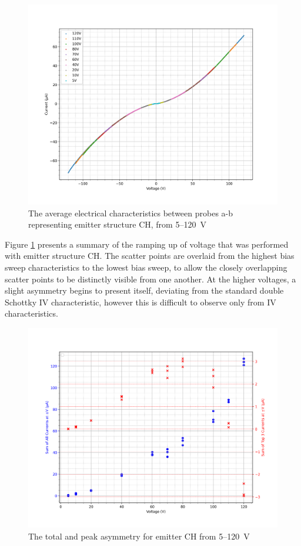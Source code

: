 \begin{refsection}
\begin{figure}[H]
    \centering
    \includegraphics[width=\linewidth]{Chapter7/Figs/Raster/Emitters/5-120V sweeps.png}
    \caption{The average electrical characteristics between probes a-b representing emitter structure CH, from 5--120~\si{\volt}}
    \label{fig:e_ch_5-120v_iv}
\end{figure}

Figure \ref{fig:e_ch_5-120v_iv} presents a summary of the ramping up of voltage that was performed with emitter structure CH. The scatter points are overlaid from the highest bias sweep characteristics to the lowest bias sweep, to allow the closely overlapping scatter points to be distinctly visible from one another. At the higher voltages, a slight asymmetry begins to present itself, deviating from the standard double Schottky IV characteristic, however this is difficult to observe only from IV characteristics.

\begin{figure}[H]
    \centering
    \includegraphics[width=\linewidth]{Chapter7/Figs/Raster/Emitters/5-120V asymmetry.png}
    \caption{The total and peak asymmetry for emitter CH from 5--120~\si{\volt}}
    \label{fig:e_ch_5-120v_asymmetry}
\end{figure}


\end{refsection}
